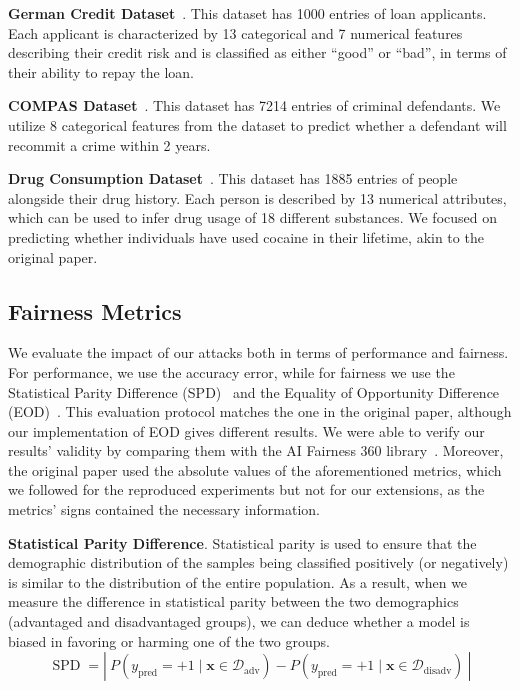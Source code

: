 \textbf{German Credit Dataset\footnotemark}~\cite{german_credit}. This dataset has 1000 entries of loan applicants. Each applicant is characterized by 13 categorical and 7 numerical features describing their credit risk and is classified as either ``good'' or ``bad'', in terms of their ability to repay the loan.

\textbf{COMPAS Dataset\footnotemark}~\cite{compas}. This dataset has 7214 entries of criminal defendants. We utilize 8 categorical features from the dataset to predict whether a defendant will recommit a crime within 2 years.

\textbf{Drug Consumption Dataset\footnotemark}~\cite{drug_consumption}. This dataset has 1885 entries of people alongside their drug history. Each person is described by 13 numerical attributes, which can be used to infer drug usage of 18 different substances. We focused on predicting whether individuals have used cocaine in their lifetime, akin to the original paper.

\subsection{Fairness Metrics}
\label{sec:metrics}
We evaluate the impact of our attacks both in terms of performance and fairness. For performance, we use the accuracy error, while for fairness we use the Statistical Parity Difference (SPD)~\cite{dwork2011fairness} and the Equality of Opportunity Difference (EOD)~\cite{hardt2016equality}. This evaluation protocol matches the one in the original paper, although our implementation of EOD gives different results. We were able to verify our results' validity by comparing them with the AI Fairness 360 library~\cite{aif360}. Moreover, the original paper used the absolute values of the aforementioned metrics, which we followed for the reproduced experiments but not for our extensions, as the metrics' signs contained the necessary information.

\textbf{Statistical Parity Difference}. Statistical parity is used to ensure that the demographic distribution of the samples being classified positively (or negatively) is similar to the distribution of the entire population. As a result, when we measure the difference in statistical parity between the two demographics (advantaged and disadvantaged groups), we can deduce whether a model is biased in favoring or harming one of the two groups.
\begin{equation*}
    \operatorname{SPD} =
    \left|~P(y_{\text{pred}} = +1 \mid \mathbf{x} \in \mathcal{D}_\text{adv})
    - P(y_{\text{pred}} = +1 \mid \mathbf{x} \in \mathcal{D}_\text{disadv})~\right|
\end{equation*}

